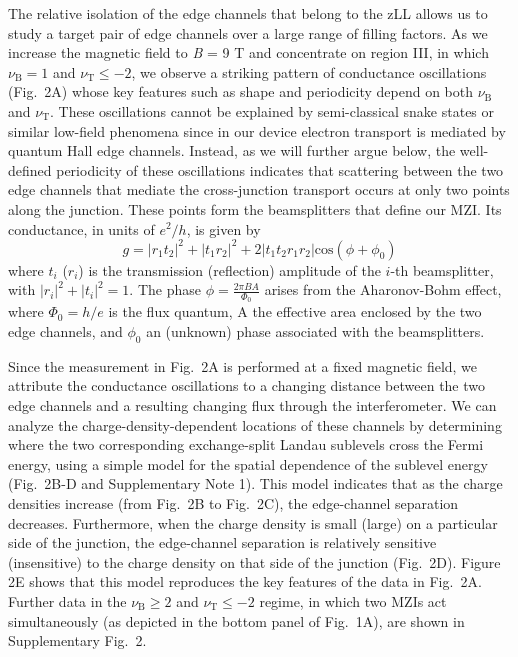 \documentclass[%
reprint,amsmath,amssymb,aps,prl,superscriptaddress,
twocolumn
]{revtex4-1}
\begin{document}
	The relative isolation of the edge channels that belong to the zLL allows us to study a target pair of edge channels over a large range of filling factors. As we increase the magnetic field to  \emph{B} = 9 T and concentrate on region III, in which $\nu_\mathrm{B}=1$ and $\nu_\mathrm{T} \leq -2$, we observe a striking pattern of conductance oscillations (Fig.~2A) whose key features such as shape and periodicity depend on both $\nu_\mathrm{B}$ and $\nu_\mathrm{T}$. These oscillations cannot be explained by semi-classical snake states or similar low-field phenomena \cite{Williams2011, Rickhaus2015, Taychatanapat2015, Overweg2016} since in our device electron transport is mediated by quantum Hall edge channels. Instead, as we will further argue below, the well-defined periodicity of these oscillations indicates that scattering between the two edge channels that mediate the cross-junction transport occurs at only two points along the junction. These points form the beamsplitters that define our MZI. Its conductance, in units of $e^2/h$, is given by  
	\begin{equation}
	g = |r_1t_2|^2+|t_1r_2|^2+2|t_1t_2r_1r_2| \text{cos}(\phi+\phi_0)
	\label{eq:cos}
	\end{equation}
	where $t_i$ ($r_i$) is the transmission (reflection) amplitude of the $i$-th beamsplitter, with $|r_i|^2+|t_i|^2=1$. The phase $\phi= \frac{2 \pi BA}{\Phi_0}$  arises from the Aharonov-Bohm effect, where $\Phi_0=h/e$ is the flux quantum, A the effective area enclosed by the two edge channels, and $\phi_0$ an (unknown) phase associated with the beamsplitters. 
	
	Since the measurement in Fig.~2A is performed at a fixed magnetic field, we attribute the conductance oscillations to a changing distance between the two edge channels and a resulting changing flux through the interferometer. We can analyze the charge-density-dependent locations of these channels by determining where the two corresponding exchange-split Landau sublevels cross the Fermi energy, using a simple model for the spatial dependence of the sublevel energy (Fig.~2B-D and Supplementary Note 1). This model indicates that as the charge densities increase (from Fig.~2B to Fig.~2C), the edge-channel separation decreases. Furthermore, when the charge density is small (large) on a particular side of the junction, the edge-channel separation is relatively sensitive (insensitive) to the charge density on that side of the junction (Fig.~2D). Figure 2E shows that this model reproduces the key features of the data in Fig.~2A. Further data in the $\nu_\mathrm{B} \geq 2$ and $\nu_\mathrm{T} \leq -2$ regime, in which two MZIs act simultaneously (as depicted in the bottom panel of Fig.~1A), are shown in Supplementary Fig.~2.
\end{document}
